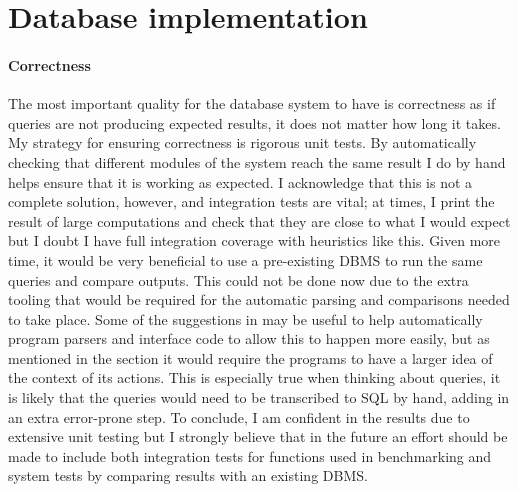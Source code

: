 \section{Database implementation} %
\paragraph{Correctness} The most important quality for the database system to
have is correctness as if queries are not producing expected results, it does
not matter how long it takes. My strategy for ensuring correctness is rigorous
unit tests. By automatically checking that different modules of the system reach
the same result I do by hand helps ensure that it is working as expected. I
acknowledge that this is not a complete solution, however, and integration tests are vital;
at times, I print the result of large computations and check that they are close
to what I would expect but I doubt I have full integration coverage with
heuristics like this. Given more time, it would be very beneficial to use a
pre-existing DBMS to run the same queries and compare outputs. This could not be
done now due to the extra tooling that would be required for the automatic
parsing and comparisons needed to take place. Some of the suggestions in
 may be useful to help automatically
program parsers and interface code to allow this to happen more easily, but as
mentioned in the section it would require the programs to have a larger idea of
the context of its actions. This is especially true when thinking about
queries, it is likely that the queries would need to be transcribed to SQL by
hand, adding in an extra error-prone step. To conclude, I am confident in the
results due to extensive unit testing but I strongly believe that in the future an
effort should be made to include both integration tests for functions used in
benchmarking and system tests by comparing results with an existing DBMS.


